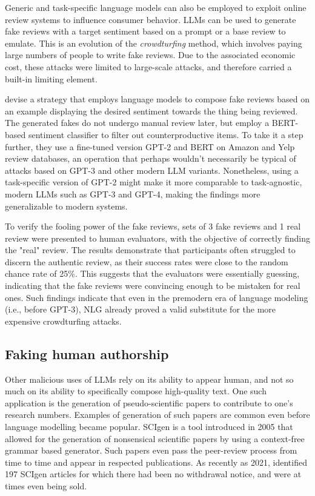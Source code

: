 Generic and task-specific language models can also be employed to exploit online review systems to influence consumer behavior. LLMs can be used to generate fake reviews with a target sentiment based on a prompt or a base review to emulate.
This is an evolution of the \emph{crowdturfing} method, which involves paying large numbers of people to write fake reviews.
Due to the associated economic cost, these attacks were limited to large-scale attacks, and therefore carried a built-in limiting element.

\citet{adelani2019reviews} devise a strategy that employs language models to compose fake reviews based on an example displaying the desired sentiment towards the thing being reviewed.
The generated fakes do not undergo manual review later, but employ a BERT-based sentiment classifier to filter out counterproductive items.
To take it a step further, they use a fine-tuned version GPT-2 and BERT on Amazon and Yelp review databases, an operation that perhaps wouldn't necessarily be typical of attacks based on GPT-3 and other modern LLM variants.
Nonetheless, using a task-specific version of GPT-2 might make it more comparable to task-agnostic, modern LLMs such as GPT-3 and GPT-4, making the findings more generalizable to modern systems.

To verify the fooling power of the fake reviews, sets of 3 fake reviews and 1 real review were presented to human evaluators, with the objective of correctly finding the "real" review.
The results demonstrate that participants often struggled to discern the authentic review, as their success rates were close to the random chance rate of 25\%.
This suggests that the evaluators were essentially guessing, indicating that the fake reviews were convincing enough to be mistaken for real ones.
Such findings indicate that even in the premodern era of language modeling (i.e., before GPT-3), NLG already proved a valid substitute for the more expensive crowdturfing attacks.

\subsection{Faking human authorship}

Other malicious uses of LLMs rely on its ability to appear human, and not so much on its ability to specifically compose high-quality text.
One such application is the generation of pseudo-scientific papers to contribute to one's research numbers.
Examples of generation of such papers are common even before language modelling became popular.
SCIgen \citep{hargrave2005scigen} is a tool introduced in 2005 that allowed for the generation of nonsensical scientific papers by using a context-free grammar based generator.
Such papers even pass the peer-review process from time to time and appear in respected publications.
As recently as 2021, \citet{cabanac2021prevalence} identified 197 SCIgen articles for which there had been no withdrawal notice, and were at times even being sold.

